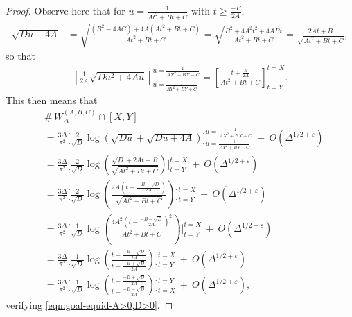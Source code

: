\documentclass[11pt,letterpaper,reqno]{amsart}
\numberwithin{equation}{section}
\numberwithin{figure}{section}
\numberwithin{table}{section}
\newcommand{\lrp}[1]{\left(#1\right)}
\newcommand{\lrb}[1]{\left[#1\right]}
\begin{document}
\begin{proof}
Observe here that for $u = \frac{1}{At^2+Bt+C}$ with $t \ge \frac{-B}{2A}$, 
\begin{align}
    \sqrt{Du + 4A} &= \sqrt{\frac{(B^2-4AC) + 4A(At^2+Bt+C)}{At^2+Bt+C}} = \sqrt{\frac{B^2 + 4A^2t^2 + 4ABt}{At^2+Bt+C}} = \frac{2At+B}{\sqrt{At^2+Bt+C}},
\end{align}
so that
\begin{align}
    \lrb{
        \frac{1}{2A} \sqrt{Du^2+4Au}
    }_{u=\frac{1}{AY^2+BY+C}}^{u=\frac{1}{AX^2+BX+C}} = \lrb{\frac{t+\frac{B}{2A}}{At^2+Bt+C}}_{t=Y}^{t=X}.
\end{align}
This then means that 
\begin{align}
     & \#\, W_{\Delta}^{(A,B,C)} \cap [X,Y] \\ 
    &=  \frac{3\Delta}{\pi^2}\Bigg[ 
            \frac{2}{\sqrt D}
            \log\lrp{
                \sqrt{Du} + \sqrt{Du+4A}
            }
         \Bigg]_{u=\frac{1}{AY^2+BY+C}}^{u=\frac{1}{AX^2+BX+C}} ~+~ O(\Delta^{1/2+\varepsilon}) \label{eqn:tempVABC-log-formula} \\
    &=  \frac{3\Delta}{\pi^2}\Bigg[
            \frac{2}{\sqrt D}
            \log\lrp{  
                \frac{\sqrt D + 2At+B}{\sqrt{At^2+Bt+C}}
            }
         \Bigg]_{t=Y}^{t=X} 
        ~+~ O(\Delta^{1/2+\varepsilon}) \\
    &=  \frac{3\Delta}{\pi^2}\Bigg[ 
            \frac{2}{\sqrt D} 
            \log\lrp{
                \frac{
                    2A\lrp{
                        t - \frac{-B-\sqrt{D}}{2A}
                    }
                }{
                    \sqrt{At^2+Bt+C}
                }
            }
         \Bigg]_{t=Y}^{t=X} 
         ~+~ O(\Delta^{1/2+\varepsilon}) \\
    &=  \frac{3\Delta}{\pi^2}\Bigg[ 
            \frac{1}{\sqrt D} 
            \log\lrp{
                \frac{
                    4A^2\lrp{
                        t - \frac{-B-\sqrt{D}}{2A}
                    }^2
                }{
                    At^2+Bt+C
                }
            }
         \Bigg]_{t=Y}^{t=X} 
         ~+~ O(\Delta^{1/2+\varepsilon}) \\
    &=  \frac{3\Delta}{\pi^2}\Bigg[ 
            \frac{1}{\sqrt D} \log\lrp{\frac{{
                t - \frac{-B-\sqrt{D}}{2A}
            }}{t - \frac{-B+\sqrt{D}}{2A}}}
         \Bigg]_{t=Y}^{t=X} 
         ~+~ O(\Delta^{1/2+\varepsilon}) \\
    &= \frac{3\Delta}{\pi^2}
    \Bigg[ 
        \frac{1}{\sqrt D}
        \log\lrp{
        \frac{
            t - \frac{-B+\sqrt{D}}{2A}
        }{
            t - \frac{-B-\sqrt{D}}{2A}
        }
        }
    \Bigg]_{t=X}^{t=Y} 
         ~+~ O(\Delta^{1/2+\varepsilon}),
\end{align}
verifying \eqref{eqn:goal-equid-A>0,D>0}.





\end{proof}
\end{document}
